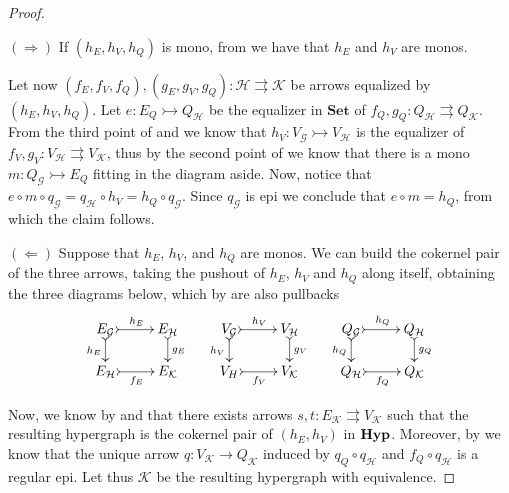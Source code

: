 \documentclass[a4paper,UKenglish,cleveref,pdftex,amsthm,thm-restate,numberwithinsect]{cas-sc}
\theoremstyle{plain}
\theoremstyle{definition}
\newcommand{\Set}{\mathbf{Set}}
\newcommand{\catname}[1]{\textbf{\textup{#1}}}
\newcommand{\hyp}{\catname{Hyp}}
\newcommand{\mto}{\rightarrowtail}
\begin{document}
\mn*

\begin{proof}\label{proof:regmono}

$(\Rightarrow)$	If $(h_E, h_V, h_Q)$ is mono, from  we have that $h_E$ and $h_V$ are monos.

\noindent
	\parbox{11cm}{
		\hspace{15pt}Let now $(f_E, f_V, f_Q), (g_E, g_V, g_Q): \mathcal{H\rightrightarrows K}$ be arrows equalized by $(h_E, h_V, h_Q)$. Let $e\colon E_Q\mto Q_{\mathcal{H}}$ be the equalizer in
	$\Set$ of $f_Q, g_Q\colon Q_{\mathcal{H}}\rightrightarrows Q_{\mathcal{K}}$. From the third point of  and  we know that $h_V\colon V_{\mathcal{G}}\mto V_{\mathcal{H}} $ 
	is the equalizer of $f_V, g_V\colon V_{\mathcal{H}}\rightrightarrows V_{\mathcal{K}}$, thus by the second point of  we know that there is a mono 
	$m\colon Q_{\mathcal{G}}\mto E_Q$ fitting in the diagram aside. Now, notice that 
	$e\circ m\circ q_{\mathcal{G}}=q_\mathcal{H}\circ h_V=h_{Q}\circ q_{\mathcal{G}}$.
	Since $q_{\mathcal{G}}$ is epi we conclude that $e\circ m=h_Q$, from which the claim follows.}
	\hfill
	\parbox{2cm}{}   
	
	$(\Leftarrow)$ Suppose that $h_E$, $h_V$, and $h_Q$  are monos. 
	We can build the cokernel pair of the three arrows, taking the pushout of $h_E$, $h_V$ and $h_Q$ along itself, obtaining the three diagrams below, which by  are also pullbacks
	\[     \xymatrix@R=15pt{
	E_\mathcal{G} \ar@{>->}[d]_{h_E} \ar@{>->}[r]^{h_E}&E_\mathcal{H} \ar@{>->}[d]^{g_E} &	V_\mathcal{G} \ar@{>->}[d]_{h_V} \ar@{>->}[r]^{h_V}& V_\mathcal{H} \ar@{>->}[d]^{g_V} &Q_\mathcal{G} \ar@{>->}[d]_{h_Q} \ar@{>->}[r]^{h_Q}& Q_\mathcal{H} \ar@{>->}[d]^{g_Q} \\
		E_\mathcal{H} \ar@{>->}[r]_{f_E} & E_\mathcal{{K}} & V_H \ar@{>->}[r]_{f_V} & V_\mathcal{{K}} & Q_\mathcal{H} \ar@{>->}[r]_{f_Q} & Q_\mathcal{{K}}
	}
	\]   
	
	Now, we know by  and  that there exists arrows $s,t\colon E_{\mathcal{K}}\rightrightarrows V_{\mathcal{K}}$ such that the resulting hypergraph is the cokernel pair of $(h_E, h_V)$ in $\hyp$. Moreover, by  we know that the unique arrow $q\colon V_{\mathcal{K}}\to Q_{\mathcal{K}}$
	induced by $q_{Q}\circ q_{\mathcal{H}}$ and $f_{Q}\circ q_{\mathcal{H}}$ is a regular epi. Let thus $\mathcal{K}$ be the resulting hypergraph with equivalence.
	

\end{proof}
\end{document}
